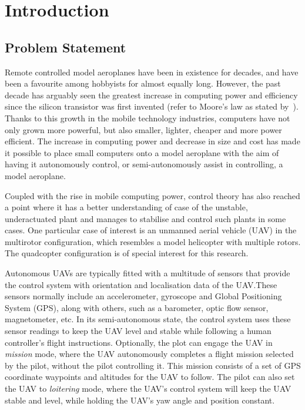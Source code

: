 \chapter{Introduction}
\label{chap1}

\section{Problem Statement}
\label{sec:problem-statement}

Remote controlled model aeroplanes have been in existence for decades, and have been a favourite among hobbyists for almost equally long. However, the past decade has arguably seen the greatest increase in computing power and efficiency since the silicon transistor was first invented (refer to Moore's law as stated by~\cite{moore2005cramming}). Thanks to this growth in the mobile technology industries, computers have not only grown more powerful, but also smaller, lighter, cheaper and more power efficient. The increase in computing power and decrease in size and cost has made it possible to place small computers onto a model aeroplane with the aim of having it autonomously control, or semi-autonomously assist in controlling, a model aeroplane. 

Coupled with the rise in mobile computing power, control theory has also reached a point where it has a better understanding of case of the unstable, underactuated plant and manages to stabilise and control such plants in some cases. One particular case of interest is an unmanned aerial vehicle (UAV) in the multirotor configuration, which resembles a model helicopter with multiple rotors. The quadcopter configuration is of special interest for this research. 

Autonomous UAVs are typically fitted with a multitude of sensors that provide the control system with orientation and localisation data of the UAV.\@ These sensors normally include an accelerometer, gyroscope and Global Positioning System (GPS), along with others, such as a barometer, optic flow sensor, magnetometer, etc. In its semi-autonomous state, the control system uses these sensor readings to keep the UAV level and stable while following a human controller's flight instructions. Optionally, the plot can engage the UAV in \emph{mission} mode, where the UAV autonomously completes a flight mission selected by the pilot, without the pilot controlling it. This mission consists of a set of GPS coordinate waypoints and altitudes for the UAV to follow. The pilot can also set the UAV to \emph{loitering} mode, where the UAV's control system will keep the UAV stable and level, while holding the UAV's yaw angle and position constant. 

